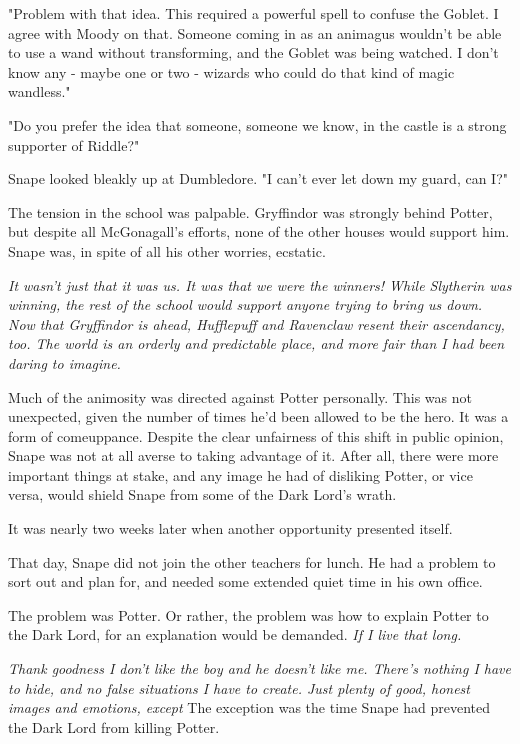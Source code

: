 "Problem with that idea. This required a powerful spell to confuse the Goblet. I agree with Moody on that. Someone coming in as an animagus wouldn't be able to use a wand without transforming, and the Goblet was being watched. I don't know any - maybe one or two - wizards who could do that kind of magic wandless."

"Do you prefer the idea that someone, someone we know, in the castle is a strong supporter of Riddle?"

Snape looked bleakly up at Dumbledore. "I can't ever let down my guard, can I?"

The tension in the school was palpable. Gryffindor was strongly behind Potter, but despite all McGonagall's efforts, none of the other houses would support him. Snape was, in spite of all his other worries, ecstatic.

\emph{It wasn't just that it was us. It was that we were the winners! While Slytherin was winning, the rest of the school would support anyone trying to bring us down. Now that Gryffindor is ahead, Hufflepuff and Ravenclaw resent their ascendancy, too. The world is an orderly and predictable place, and more fair than I had been daring to imagine.}

Much of the animosity was directed against Potter personally. This was not unexpected, given the number of times he'd been allowed to be the hero. It was a form of comeuppance. Despite the clear unfairness of this shift in public opinion, Snape was not at all averse to taking advantage of it. After all, there were more important things at stake, and any image he had of disliking Potter, or vice versa, would shield Snape from some of the Dark Lord's wrath.

It was nearly two weeks later when another opportunity presented itself.

That day, Snape did not join the other teachers for lunch. He had a problem to sort out and plan for, and needed some extended quiet time in his own office.

The problem was Potter. Or rather, the problem was how to explain Potter to the Dark Lord, for an explanation would be demanded. \emph{If I live that long.}

\emph{Thank goodness I don't like the boy and he doesn't like me. There's nothing I have to hide, and no false situations I have to create. Just plenty of good, honest images and emotions, except{\el}} The exception was the time Snape had prevented the Dark Lord from killing Potter.

